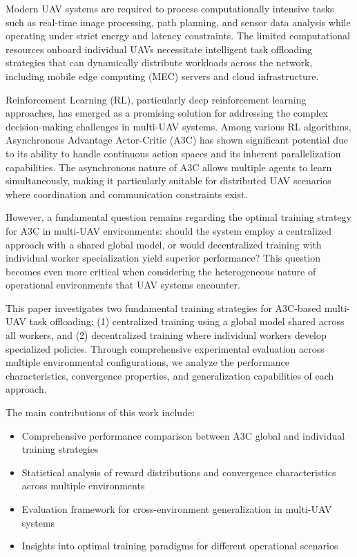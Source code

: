 \documentclass[journal]{IEEEtran}
\begin{document}
Modern UAV systems are required to process computationally intensive tasks such as real-time image processing, path planning, and sensor data analysis while operating under strict energy and latency constraints. The limited computational resources onboard individual UAVs necessitate intelligent task offloading strategies that can dynamically distribute workloads across the network, including mobile edge computing (MEC) servers and cloud infrastructure.

Reinforcement Learning (RL), particularly deep reinforcement learning approaches, has emerged as a promising solution for addressing the complex decision-making challenges in multi-UAV systems. Among various RL algorithms, Asynchronous Advantage Actor-Critic (A3C) has shown significant potential due to its ability to handle continuous action spaces and its inherent parallelization capabilities. The asynchronous nature of A3C allows multiple agents to learn simultaneously, making it particularly suitable for distributed UAV scenarios where coordination and communication constraints exist.

However, a fundamental question remains regarding the optimal training strategy for A3C in multi-UAV environments: should the system employ a centralized approach with a shared global model, or would decentralized training with individual worker specialization yield superior performance? This question becomes even more critical when considering the heterogeneous nature of operational environments that UAV systems encounter.

This paper investigates two fundamental training strategies for A3C-based multi-UAV task offloading: (1) centralized training using a global model shared across all workers, and (2) decentralized training where individual workers develop specialized policies. Through comprehensive experimental evaluation across multiple environmental configurations, we analyze the performance characteristics, convergence properties, and generalization capabilities of each approach.

The main contributions of this work include:
\begin{itemize}
\item Comprehensive performance comparison between A3C global and individual training strategies
\item Statistical analysis of reward distributions and convergence characteristics across multiple environments
\item Evaluation framework for cross-environment generalization in multi-UAV systems
\item Insights into optimal training paradigms for different operational scenarios
\end{itemize}
\end{document}
